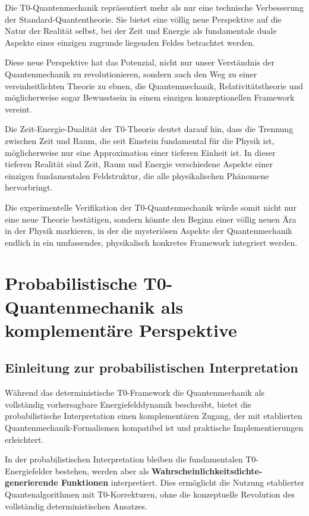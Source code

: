 \documentclass[12pt,a4paper]{article}
\theoremstyle{definition}
\theoremstyle{remark}
\begin{document}
Die T0-Quantenmechanik repräsentiert mehr als nur eine technische Verbesserung der Standard-Quantentheorie. Sie bietet eine völlig neue Perspektive auf die Natur der Realität selbst, bei der Zeit und Energie als fundamentale duale Aspekte eines einzigen zugrunde liegenden Feldes betrachtet werden.

Diese neue Perspektive hat das Potenzial, nicht nur unser Verständnis der Quantenmechanik zu revolutionieren, sondern auch den Weg zu einer vereinheitlichten Theorie zu ebnen, die Quantenmechanik, Relativitätstheorie und möglicherweise sogar Bewusstsein in einem einzigen konzeptionellen Framework vereint.

Die Zeit-Energie-Dualität der T0-Theorie deutet darauf hin, dass die Trennung zwischen Zeit und Raum, die seit Einstein fundamental für die Physik ist, möglicherweise nur eine Approximation einer tieferen Einheit ist. In dieser tieferen Realität sind Zeit, Raum und Energie verschiedene Aspekte einer einzigen fundamentalen Feldstruktur, die alle physikalischen Phänomene hervorbringt.

Die experimentelle Verifikation der T0-Quantenmechanik würde somit nicht nur eine neue Theorie bestätigen, sondern könnte den Beginn einer völlig neuen Ära in der Physik markieren, in der die mysteriösen Aspekte der Quantenmechanik endlich in ein umfassendes, physikalisch konkretes Framework integriert werden.
\section{Probabilistische T0-Quantenmechanik als komplementäre Perspektive}

\subsection{Einleitung zur probabilistischen Interpretation}

Während das deterministische T0-Framework die Quantenmechanik als vollständig vorhersagbare Energiefelddynamik beschreibt, bietet die probabilistische Interpretation einen komplementären Zugang, der mit etablierten Quantenmechanik-Formalismen kompatibel ist und praktische Implementierungen erleichtert.

\begin{tcolorbox}[colback=orange!5!white,colframe=orange!75!black,title=Probabilistische T0-Perspektive]
	In der probabilistischen Interpretation bleiben die fundamentalen T0-Energiefelder bestehen, werden aber als \textbf{Wahrscheinlichkeitsdichte-generierende Funktionen} interpretiert. Dies ermöglicht die Nutzung etablierter Quantenalgorithmen mit T0-Korrekturen, ohne die konzeptuelle Revolution des vollständig deterministischen Ansatzes.
\end{tcolorbox}
\end{document}
